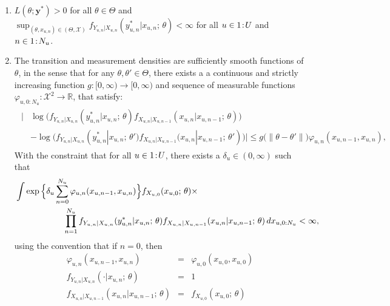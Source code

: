\begin{enumerate}[label=(B\arabic*), ref=(B\arabic*)]
\item $L(\theta; \bm{y}^*) > 0$ for all $\theta \in \Theta$ and $\sup_{(\theta, x_{u, n})\in (\Theta, \mathcal{X})}f_{Y_{u, n}|X_{u, n}}(y^*_{u, n}|x_{u,n}; \, \theta) < \infty$ for all $u \in {1}\!:\!{U}$ and $n \in {1}\!:\!{N_u}$. \label{assumption:mle1}
    \item The transition and measurement densities are sufficiently smooth functions of $\theta$, in the sense that for any $\theta, \theta' \in \Theta$, there exists a a continuous and strictly increasing function $g: [0, \infty) \rightarrow [0, \infty)$ and sequence of measurable functions $\varphi_{u, 0:N_u}: \mathcal{X}^2 \rightarrow \mathbb{R}$, that satisfy:
    \begin{align*}
    \begin{split}
    |&\log\big(f_{Y_{u, n}|X_{u, n}}(y^*_{u, n}|x_{u, n};\, \theta)f_{X_{u, n}|X_{u, n-1}}(x_{u, n}|x_{u, n-1};\, \theta)\big) \\
    & - \log\big(f_{Y_{u, n}|X_{u, n}}(y^*_{u, n}|x_{u, n};\, \theta')f_{X_{u, n}|X_{u, n-1}}(x_{u, n}|x_{u, n-1};\, \theta')\big)| \leq g\big(\|\theta - \theta'\|\big)\varphi_{u, n}(x_{u, n-1}, x_{u, n}),
    \end{split}
    \end{align*}
    With the constraint that for all $u\in {1}\!:\!{U}$, there exists a $\delta_u \in (0, \infty)$ such that
    \begin{align*}
    &  \int \exp\Big\{\delta_u \sum_{n = 0}^{N_u}\varphi_{u, n}(x_{u, n-1}, x_{u, n})\Big\} f_{X_{u, 0}}(x_{u, 0};\, \theta) \times
    \\
    & \hspace{20mm} \prod_{n = 1}^{N_u}f_{Y_{u, n}|X_{u, n}}(y^*_{u, n}|x_{u, n};\, \theta)f_{X_{u, n}|X_{u, n-1}}(x_{u, n}|x_{u, n-1};\, \theta)\, dx_{u, 0:N_u} < \infty,
    \end{align*}
    using the convention that if $n=0$, then
    \begin{eqnarray*}
      \varphi_{u, n}(x_{u, n-1}, x_{u, n}) &=& \varphi_{u, 0}(x_{u, 0}, x_{u, 0})
      \\
      f_{Y_{u, n}|X_{u, n}}(\cdot | x_{u, n}; \, \theta) &=& 1
      \\
      f_{X_{u, n} | X_{u, n-1}}(x_{u, n}|x_{u, n-1};\, \theta) &=& f_{X_{u, 0}}(x_{u, 0}; \, \theta)
    \end{eqnarray*}\label{assumption:mle2}
\end{enumerate}

